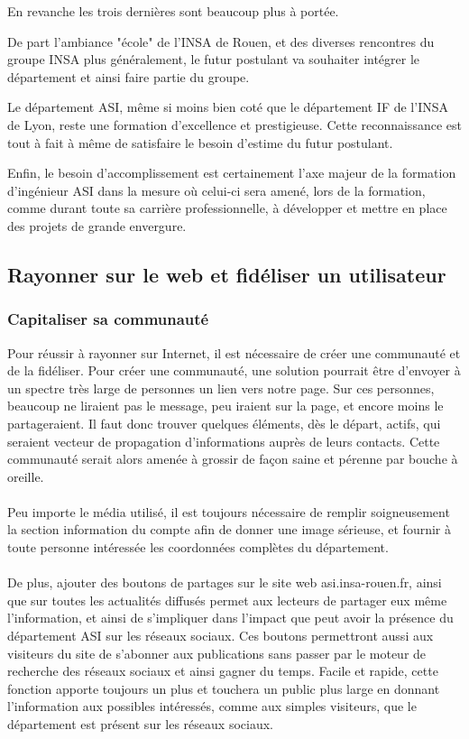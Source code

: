 En revanche les trois dernières sont beaucoup plus à portée. 

De part l'ambiance "école" de l'INSA de Rouen, et des diverses rencontres du groupe INSA plus généralement, le futur postulant va souhaiter intégrer le 
département et ainsi faire partie du groupe.

Le département ASI, même si moins bien coté que le département IF de l'INSA de Lyon, reste une formation d'excellence et prestigieuse. Cette 
reconnaissance est tout à fait à même de satisfaire le besoin d'estime du futur postulant.

Enfin, le besoin d'accomplissement est certainement l'axe majeur de la formation d'ingénieur ASI dans la mesure où celui-ci sera amené, lors de 
la formation, comme durant toute sa carrière professionnelle, à développer et mettre en place des projets de grande envergure.

\subsection{Rayonner sur le web et fidéliser un utilisateur}
\subsubsection{Capitaliser sa communauté}
Pour réussir à rayonner sur Internet, il est nécessaire de créer une communauté et de la fidéliser. Pour créer une communauté, une solution pourrait 
être d'envoyer à un spectre très large de personnes un lien vers notre page. Sur ces personnes, beaucoup ne liraient pas le message, peu iraient sur 
la page, et encore moins le partageraient. Il faut donc trouver quelques éléments, dès le départ, actifs, qui seraient vecteur de propagation 
d'informations auprès de leurs contacts. Cette communauté serait alors amenée à grossir de façon saine et pérenne par bouche à oreille.

\paragraph{}
Peu importe le média utilisé, il est toujours nécessaire de remplir soigneusement la section information du compte afin de donner une image sérieuse, 
et fournir à toute personne intéressée les coordonnées complètes du département.

\paragraph{}
De plus, ajouter des boutons de partages sur le site web asi.insa-rouen.fr, ainsi que sur toutes les actualités diffusés permet aux lecteurs de 
partager eux même l'information, et ainsi de s'impliquer dans l'impact que peut avoir la présence du département ASI sur les réseaux sociaux. Ces 
boutons permettront aussi aux visiteurs du site de s'abonner aux publications sans passer par le moteur de recherche des réseaux sociaux et ainsi 
gagner du temps. Facile et rapide, cette fonction apporte toujours un plus et touchera un public plus large en donnant l'information aux possibles 
intéressés, comme aux simples visiteurs, que le département est présent sur les réseaux sociaux.

